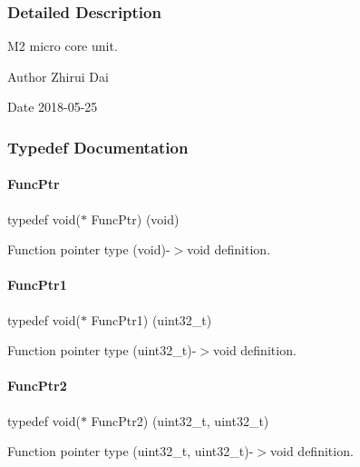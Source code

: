 \subsubsection{Detailed Description}
M2 micro core unit. 

\begin{DoxyAuthor}{Author}
Zhirui Dai 
\end{DoxyAuthor}
\begin{DoxyDate}{Date}
2018-\/05-\/25 
\end{DoxyDate}


\subsubsection{Typedef Documentation}
\mbox{\label{a00020_a3d987633d7a3ca10c14905a807b62eb1}} 
\paragraph{\texorpdfstring{Func\+Ptr}{FuncPtr}}
{\footnotesize\ttfamily typedef void($\ast$ Func\+Ptr) (void)}

Function pointer type (void)-\/$>$void definition. \mbox{\label{a00020_a0891965816a5b721b07f7bebefaf7430}} 
\paragraph{\texorpdfstring{Func\+Ptr1}{FuncPtr1}}
{\footnotesize\ttfamily typedef void($\ast$ Func\+Ptr1) (uint32\+\_\+t)}

Function pointer type (uint32\+\_\+t)-\/$>$void definition. \mbox{\label{a00020_a331a88eeefe11112bb8fe1b43dd777b8}} 
\paragraph{\texorpdfstring{Func\+Ptr2}{FuncPtr2}}
{\footnotesize\ttfamily typedef void($\ast$ Func\+Ptr2) (uint32\+\_\+t, uint32\+\_\+t)}

Function pointer type (uint32\+\_\+t, uint32\+\_\+t)-\/$>$void definition. \mbox{\label{a00020_a06da901348542a481c297d9b700e2001}} 
